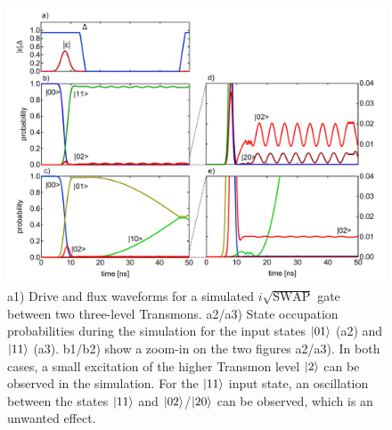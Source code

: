 \smallskip

\begin{figure}[ht!]
	\centering
	\includegraphics[width=\textwidth]{./data/simulation/three_level_swap/plots}
	\caption{a1) Drive and flux waveforms for a simulated $i\sqrt{\mathrm{SWAP}}$ gate between two three-level Transmons. a2/a3) State occupation probabilities during the simulation for the input states $\left| 01 \right>$ (a2) and $\left| 11 \right>$ (a3). b1/b2) show a zoom-in on the two figures a2/a3). In both cases, a small excitation of the higher Transmon level $\left| 2 \right>$ can be observed in the simulation. For the $\left| 11 \right>$ input state, an oscillation between the states $\left| 11 \right>$ and $\left| 02 \right>$/$\left| 20 \right>$ can be observed, which is an unwanted effect. }
	\label{fig:swap_3_level_data}
\end{figure}

